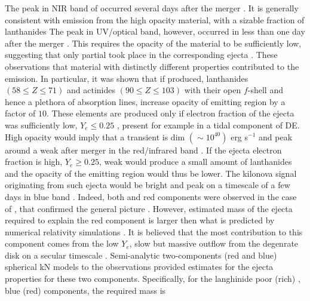 %
The peak in \ac{NIR} band of \AT{} occurred several days after the merger \citep{Chornock:2017sdf}.
It is generally consistent with emission from the high opacity material, with a sizable 
fraction of lanthanides \citep{Kasen:2013xka}
%
The peak in \ac{UV}/optical band, however, occurred in less than one day after the merger 
\citep{Nicholl:2017ahq}. This requires the opacity of the material to be sufficiently low, 
suggesting that only partial \rproc{} \nuc{} took place in the corresponding ejecta 
\citep{Martin:2015hxa}.
%
These observations that material with distinctly different properties contributed to the emission.
%
In particular, it was shown that if produced, 
lanthanides $(58\leq Z \leq71)$ and actinides $(90\leq Z \leq 103)$ with their open 
$f$-shell and hence a plethora of absorption lines, increase opacity of emitting 
region by a factor of $10$. 
%
These elements are produced only if electron fraction of the ejecta was sufficiently low, 
$Y_e\leq 0.25$ \citep{Lippuner:2015gwa}, present for example in a tidal component of \ac{DE}. 
High opacity would imply that a transient is dim $(\sim10^{40})$ erg s$^{-1}$ and peak around a 
weak after merger in the red/infrared band \citep{Barnes:2013wka,Grossman:2013lqa,Lippuner:2015gwa}. 
%
If the ejecta electron fraction is high, $Y_e \geq 0.25$, weak \rproc{} would produce a small amount 
of lanthanides and the opacity of the emitting region would thus be lower. The kilonova signal originating 
from such ejecta would be bright and peak on a timescale of a few days in blue band 
\citep{Kasen:2014toa,Martin:2015hxa}. 
%
%
Indeed, both and red components were observed in the case of \AT{}, that confirmed the general 
picture \citep[\eg][]{Villar:2017wcc}. However, estimated mass of the ejecta required to explain 
the red component is larger then what is predicted by numerical relativity simulations . 
It is believed that the most contribution to this component comes from the low $Y_e$, slow but 
massive outflow from the degenrate disk on a secular timescale .
%
Semi-analytic two-components (red and blue) spherical \ac{kN} models to the \AT{} observations 
provided estimates for the ejecta properties for these two components. 
%
Specifically, for the langhinide poor (rich) \ie, blue (red) components, the required mass is 
